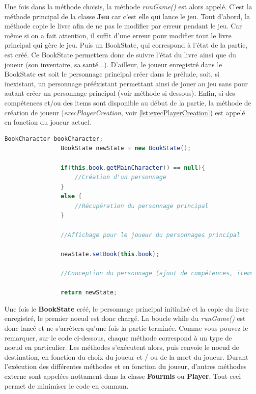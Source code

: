 			Une fois dans la méthode choisis, la méthode \textit{runGame()} est alors appelé. C'est la méthode principal de la classe \textbf{Jeu} car c'est elle qui lance le jeu.
			Tout d'abord, la méthode copie le livre afin de ne pas le modifier par erreur pendant le jeu. Car même si on a fait attention, il suffit d'une erreur pour modifier tout le livre principal qui gère le jeu. Puis un BookState, qui correspond à l'état de la partie, est créé. Ce BookState permettera donc de suivre l'état du livre ainsi que du joueur (son inventaire, sa santé...). D'ailleur, le joueur enregistré dans le BookState est soit le personnage principal créer dans le prélude, soit, si inexistant, un personnage prééxistant permettant ainsi de jouer au jeu sans pour autant créer un personnage principal (voir méthode si dessous). Enfin, si des compétences et/ou des items sont disponible au début de la partie, la méthode de création de joueur (\textit{execPlayerCreation}, voir \ref{lst:execPlayerCreation}) est appelé en fonction du joueur actuel.

			\begin{lstlisting}[gobble=16, language=java, caption=createNewState()]
				BookCharacter bookCharacter;
				BookState newState = new BookState();

				if(this.book.getMainCharacter() == null){
					//Création d'un personnage
				}
				else {
					//Récupération du personnage principal
				}

				//Affichage pour le joueur du personnages principal

				newState.setBook(this.book);

				//Conception du personnage (ajout de compétences, items)

				return newState;
			\end{lstlisting}

			Une fois le \textbf{BookState} créé, le personnage principal initialisé et la copie du livre enregistré, le premier noeud est donc chargé. La boucle while du \textit{runGame()} est donc lancé et ne s'arrètera qu'une fois la partie terminée. Comme vous pouvez le remarquer, sur le code ci-dessous, chaque méthode correspond à un type de noeud en particulier. Les méthodes s'exécutent alors, puis renvoie le noeud de destination, en fonction du choix du joueur et / ou de la mort du joueur. Durant l'exécution des différentes méthodes et en fonction du joueur, d'autres méthodes externe sont appelées nottament dans la classe \textbf{Fourmis} ou \textbf{Player}. Tout ceci permet de minimiser le code en commun.


